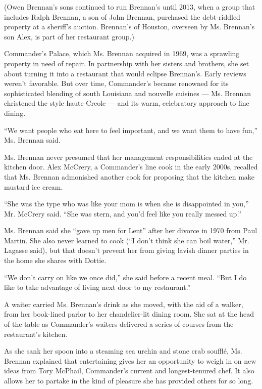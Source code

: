 (Owen Brennan's sons continued to run Brennan's until 2013, when a group
that includes Ralph Brennan, a son of John Brennan, purchased the
debt-riddled property at a sheriff's auction. Brennan's of Houston,
overseen by Ms. Brennan's son Alex, is part of her restaurant group.)

Commander's Palace, which Ms. Brennan acquired in 1969, was a sprawling
property in need of repair. In partnership with her sisters and
brothers, she set about turning it into a restaurant that would eclipse
Brennan's. Early reviews weren't favorable. But over time, Commander's
became renowned for its sophisticated blending of south Louisiana and
nouvelle cuisines --- Ms. Brennan christened the style haute Creole ---
and its warm, celebratory approach to fine dining.

``We want people who eat here to feel important, and we want them to
have fun,'' Ms. Brennan said.

Ms. Brennan never presumed that her management responsibilities ended at
the kitchen door. Alex McCrery, a Commander's line cook in the early
2000s, recalled that Ms. Brennan admonished another cook for proposing
that the kitchen make mustard ice cream.

``She was the type who was like your mom is when she is disappointed in
you,'' Mr. McCrery said. ``She was stern, and you'd feel like you really
messed up.''

Ms. Brennan said she ``gave up men for Lent'' after her divorce in 1970
from Paul Martin. She also never learned to cook (``I don't think she
can boil water,'' Mr. Lagasse said), but that doesn't prevent her from
giving lavish dinner parties in the home she shares with Dottie.

``We don't carry on like we once did,'' she said before a recent meal.
``But I do like to take advantage of living next door to my
restaurant.''

A waiter carried Ms. Brennan's drink as she moved, with the aid of a
walker, from her book-lined parlor to her chandelier-lit dining room.
She sat at the head of the table as Commander's waiters delivered a
series of courses from the restaurant's kitchen.

As she sank her spoon into a steaming sea urchin and stone crab soufflé,
Ms. Brennan explained that entertaining gives her an opportunity to
weigh in on new ideas from Tory McPhail, Commander's current and
longest-tenured chef. It also allows her to partake in the kind of
pleasure she has provided others for so long.

